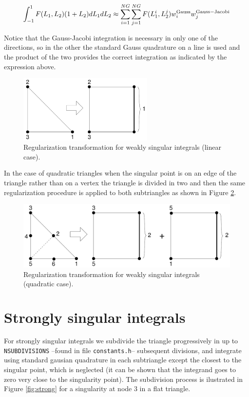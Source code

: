 \documentclass[12pt]{report}
\begin{document}
\begin{equation}
\int_{-1}^1{F(L_1,L_2)(1+L_2)dL_1dL_2} \approx \sum_{i=1}^{NG}{\sum_{j=1}^{NG}{F(L_1^i,L_2^j)w_i^{\rm Gauss}w_j^{\rm Gauss-Jacobi}}}
\end{equation}

Notice that the Gauss-Jacobi integration is necessary in only one of the directions, so in the other the standard Gauss quadrature on a line is used and the product of the two provides the correct integration as indicated by the expression above.

\begin{figure}[!hbt]
\begin{center}
\includegraphics[width=0.6\textwidth]{weakly_singular.pdf}
\caption{Regularization transformation for weakly singular integrals (linear case).}
\label{fig:weak3}
\end{center}
\end{figure}

In the case of quadratic triangles when the singular point is on an edge of the triangle rather than on a vertex the triangle is divided in two and then the same regularization procedure is applied to both subtriangles as shown in Figure \ref{fig:weak6}.

\begin{figure}[!hbt]
\begin{center}
\includegraphics[width=\textwidth]{weakly_singular_t6.pdf}
\caption{Regularization transformation for weakly singular integrals (quadratic case).}
\label{fig:weak6}
\end{center}
\end{figure}

\section{Strongly singular integrals}
For strongly singular integrals we subdivide the triangle progressively in up to \verb+NSUBDIVISIONS+ --found in file \verb+constants.h+-- subsequent divisions, and integrate using standard gausian quadrature in each subtriangle except the closest to the singular point, which is neglected (it can be shown that the integrand goes to zero very close to the singularity point). The subdivision process is ilustrated in Figure \ref{fig:strong} for a singularity at node 3 in a flat triangle.
\end{document}
